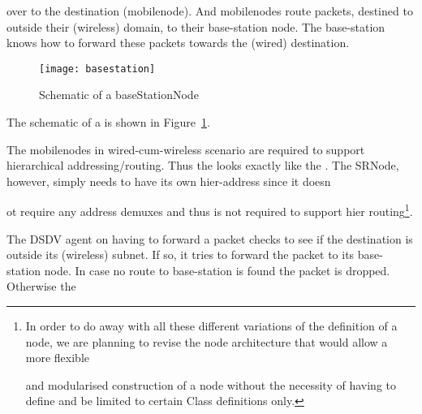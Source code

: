 { over to the destination (mobilenode). And mobilenodes route packets, destined to outside their (wireless) domain, to their base-station node. The base-station knows how to forward these packets towards the (wired) destination. 
\begin{figure}
    \centerline{\texttt{[image: basestation]}}
    \caption{Schematic of a baseStationNode}
    \label{fig:mobilenode-basestation}
\end{figure}
The schematic of a  is shown in Figure~\ref{fig:mobilenode-basestation}.

The mobilenodes in wired-cum-wireless scenario are required to support hierarchical addressing/routing. Thus the  looks exactly like the . The SRNode, however, simply needs to have its own hier-address since it doesn





















ot require any address demuxes and thus is not required to support hier routing\footnote{In order to do away with all these different variations of the definition of a node, we are planning to revise the node architecture that would allow a more flexible 





















and modularised construction of a node without the necessity of having to define and be limited to certain Class definitions only.}.

The DSDV agent on having to forward a packet checks to see if the destination is outside its (wireless) subnet. If so, it tries to forward the packet to its base-station node. In case no route to base-station is found the packet is dropped. Otherwise the 





















}
